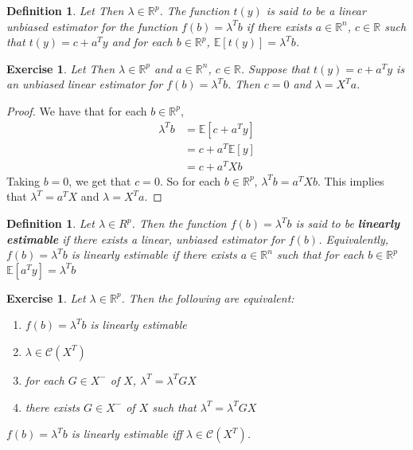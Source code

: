\documentclass[12pt]{amsart}
\newtheorem{defn}[thm]{Definition}
\newtheorem{ex}[thm]{Exercise}
\newcommand{\lam}{\lambda}
\newcommand{\E}{\mathbb{E}}
\newcommand{\R}{\mathbb{R}}
\newcommand{\MC}{\mathcal{C}}
\begin{document}
\begin{defn}
Let Then $\lam \in \R^p$. The function $t(y)$ is said to be a linear unbiased estimator for the function $f(b) = \lam^T b$ if there exists $ a \in \R^n$, $c \in \R$ such that $t(y) = c+ a^Ty$ and for each $b \in \R^p$, $\E[t(y)] = \lam^T b$. 
\end{defn}

\begin{ex}
Let Then $\lam \in \R^p$ and $ a \in \R^n$, $c \in \R$. Suppose that $t(y) = c+a^Ty$ is an unbiased linear estimator for $f(b) = \lam^T b$. Then $c = 0$ and $\lam = X^Ta$. 
\end{ex}

\begin{proof}
We have that for each $b \in \R^p$, 
\begin{align*}
\lam^Tb 
&= \E[c+a^Ty] \\
&= c + a^T\E[y] \\
&= c + a^T Xb
\end{align*}
Taking $b = 0$, we get that $c =0$. So for each $b \in \R^p$, $\lam^Tb = a^TXb$. This implies that $\lam^T = a^TX$ and $\lam = X^Ta$.
\end{proof}

\begin{defn}
Let $\lam \in R^p$. Then the function $f(b) = \lam^T b$ is said to be \textbf{linearly estimable} if there exists a linear, unbiased estimator for $f(b)$. Equivalently, $f(b) = \lam^T b$ is linearly estimable if there exists $a \in \R^n$ such that for each $b \in \R^p$ $\E[a^Ty] = \lambda^Tb$
\end{defn}

\begin{ex}
Let $\lam \in \R^p$. Then the following are equivalent: 
\begin{enumerate}
\item $f(b) = \lam^T b$ is linearly estimable
\item $\lam \in \MC(X^T)$
\item for each $G  \in X^-$ of $X$, $\lam^T = \lam^TGX$
\item there exists $G \in X^-$  of $X$ such that $\lam^T = \lam^TGX$
\end{enumerate}
$f(b) = \lam^T b$ is linearly estimable iff $\lam \in \MC(X^T)$. 
\end{ex}
\end{document}
